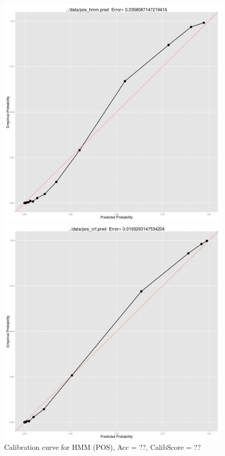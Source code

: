 \begin{figure}[t]
  \includegraphics[width=\linewidth, valign=t]{pos_hmm_pred.jpg}
  \caption{Calibration curve for HMM (POS), Acc = ??, CalibScore = ??}
  \label{fig:pos_hmm_pred}
\endminipage\hfill
{}
  \includegraphics[width=\linewidth, valign=t]{pos_crf_pred.jpg}

\end{figure}
